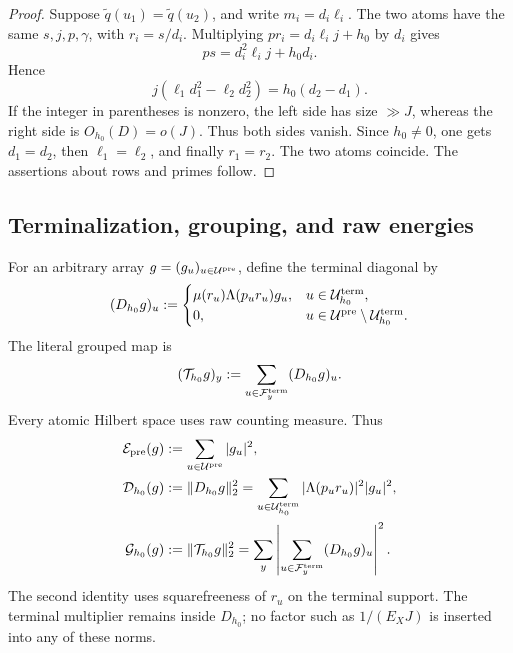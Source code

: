 \begin{proof}
Suppose \(\widetilde q(u_1)=\widetilde q(u_2)\), and write
\(m_i=d_i\ell_i\).  The two atoms have the same \(s,j,p,\gamma\), with
\(r_i=s/d_i\).  Multiplying \(pr_i=d_i\ell_i j+h_0\) by \(d_i\) gives
\[
 ps=d_i^2\ell_i j+h_0d_i.
\]
Hence
\begin{equation}
 j(\ell_1d_1^2-\ell_2d_2^2)=h_0(d_2-d_1).
 \label{eq:tpc57-fused-label-identity}
\end{equation}
If the integer in parentheses is nonzero, the left side has size
\(\gg J\), whereas the right side is \(O_{h_0}(D)=o(J)\).  Thus both
sides vanish.  Since \(h_0\ne0\), one gets \(d_1=d_2\), then
\(\ell_1=\ell_2\), and finally \(r_1=r_2\).  The two atoms coincide.
The assertions about rows and primes follow.
\end{proof}

\subsection{Terminalization, grouping, and raw energies}

For an arbitrary array \(g=(g_u)_{u\in\mathcal U^{\rm pre}}\), define the terminal
diagonal by
\begin{equation}
 (D_{h_0}g)_u
 :=\begin{cases}
 \mu(r_u)\Lambda(p_ur_u)g_u,
     &u\in\mathcal U_{h_0}^{\rm term},\\
 0,&u\in\mathcal U^{\rm pre}\setminus\mathcal U_{h_0}^{\rm term}.
 \end{cases}
 \label{eq:tpc57-terminal-diagonal-operator}
\end{equation}
The literal grouped map is
\begin{equation}
 (\mathcal T_{h_0}g)_y
 :=\sum_{u\in\mathcal F_y^{\rm term}}(D_{h_0}g)_u.
 \label{eq:tpc57-literal-grouped-map}
\end{equation}
Every atomic Hilbert space uses raw counting measure.  Thus
\begin{align}
 \mathcal E_{\rm pre}(g)
 &:=\sum_{u\in\mathcal U^{\rm pre}}|g_u|^2,
 \label{eq:tpc57-preterminal-energy}\\
 \mathcal D_{h_0}(g)
 &:=\|D_{h_0}g\|_2^2
 =\sum_{u\in\mathcal U_{h_0}^{\rm term}}
   |\Lambda(p_ur_u)|^2|g_u|^2,
 \label{eq:tpc57-terminal-diagonal-energy}\\
 \mathcal G_{h_0}(g)
 &:=\|\mathcal T_{h_0}g\|_2^2
 =\sum_y\left|
   \sum_{u\in\mathcal F_y^{\rm term}}(D_{h_0}g)_u
   \right|^2.
 \label{eq:tpc57-undeleted-grouped-energy}
\end{align}
The second identity uses squarefreeness of \(r_u\) on the terminal support.
The terminal multiplier remains inside \(D_{h_0}\); no factor such as
\(1/(E_XJ)\) is inserted into any of these norms.

